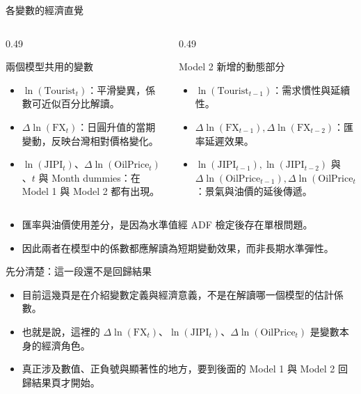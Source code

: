 \documentclass[aspectratio=169]{ctexbeamer}
\begin{document}
\begin{frame}{各變數的經濟直覺}
\begin{columns}[T]
  \begin{column}{0.49\textwidth}
    \begin{block}{兩個模型共用的變數}
    \begin{itemize}
      \item $\ln(\mathrm{Tourist}_t)$：平滑變異，係數可近似百分比解讀。
      \item $\Delta \ln(\mathrm{FX}_t)$：日圓升值的當期變動，反映台灣相對價格變化。
      \item $\ln(\mathrm{JIPI}_t)$、$\Delta \ln(\mathrm{OilPrice}_t)$、$t$ 與 Month dummies：在 Model 1 與 Model 2 都有出現。
    \end{itemize}
    \end{block}
  \end{column}
  \begin{column}{0.49\textwidth}
    \begin{block}{Model 2 新增的動態部分}
    \begin{itemize}
      \item $\ln(\mathrm{Tourist}_{t-1})$：需求慣性與延續性。
      \item $\Delta \ln(\mathrm{FX}_{t-1}),\Delta \ln(\mathrm{FX}_{t-2})$：匯率延遲效果。
      \item $\ln(\mathrm{JIPI}_{t-1}),\ln(\mathrm{JIPI}_{t-2})$ 與 $\Delta \ln(\mathrm{OilPrice}_{t-1}),\Delta \ln(\mathrm{OilPrice}_{t-2})$：景氣與油價的延後傳遞。
    \end{itemize}
    \end{block}
  \end{column}
\end{columns}
\vspace{0.5em}
\begin{itemize}
  \item 匯率與油價使用差分，是因為水準值經 ADF 檢定後存在單根問題。
  \item 因此兩者在模型中的係數都應解讀為短期變動效果，而非長期水準彈性。
\end{itemize}
\end{frame}

\begin{frame}{先分清楚：這一段還不是回歸結果}
\begin{itemize}
  \item 目前這幾頁是在介紹變數定義與經濟意義，不是在解讀哪一個模型的估計係數。
  \item 也就是說，這裡的 $\Delta \ln(\mathrm{FX}_t)$、$\ln(\mathrm{JIPI}_t)$、$\Delta \ln(\mathrm{OilPrice}_t)$ 是變數本身的經濟角色。
  \item 真正涉及數值、正負號與顯著性的地方，要到後面的 Model 1 與 Model 2 回歸結果頁才開始。
\end{itemize}
\end{frame}
\end{document}
